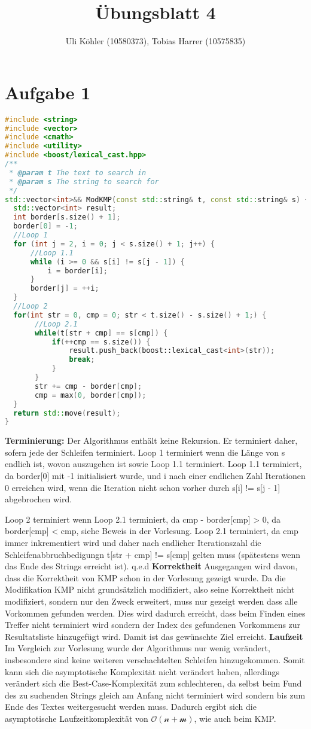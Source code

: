 \documentclass[a4paper,10pt,oneside,leqno]{scrartcl}
\title{Übungsblatt 4}
\author{Uli Köhler (10580373), Tobias Harrer (10575835)}
\begin{document}
\maketitle

\section*{Aufgabe 1}
\begin{lstlisting}[language=C++]
#include <string>
#include <vector>
#include <cmath>
#include <utility>
#include <boost/lexical_cast.hpp>
/**
 * @param t The text to search in
 * @param s The string to search for
 */
std::vector<int>&& ModKMP(const std::string& t, const std::string& s) {
  std::vector<int> result;
  int border[s.size() + 1];
  border[0] = -1;
  //Loop 1
  for (int j = 2, i = 0; j < s.size() + 1; j++) {
      //Loop 1.1
      while (i >= 0 && s[i] != s[j - 1]) {
          i = border[i];
      }
      border[j] = ++i;
  }
  //Loop 2
  for(int str = 0, cmp = 0; str < t.size() - s.size() + 1;) {
       //Loop 2.1
       while(t[str + cmp] == s[cmp]) {
           if(++cmp == s.size()) {
               result.push_back(boost::lexical_cast<int>(str));
               break;
           }
       }
       str += cmp - border[cmp];
       cmp = max(0, border[cmp]);
  }
  return std::move(result);
}
\end{lstlisting}
\textbf{Terminierung:}
Der Algorithmus enthält keine Rekursion. Er terminiert daher, sofern jede der Schleifen terminiert.
Loop 1 terminiert wenn die Länge von s endlich ist, wovon auszugehen ist sowie Loop 1.1 terminiert.
Loop 1.1 terminiert, da  border[0] mit -1 initialisiert wurde, und i nach einer endlichen Zahl Iterationen
0 erreichen wird, wenn die Iteration nicht schon vorher durch s[i] != s[j - 1] abgebrochen wird.

Loop 2 terminiert wenn Loop 2.1 terminiert, da cmp - border[cmp] > 0, da border[cmp] < cmp, siehe Beweis in der Vorlesung.
Loop 2.1 terminiert, da cmp immer inkrementiert wird und daher nach endlicher Iterationszahl die Schleifenabbruchbedigungn
t[str + cmp] != s[cmp] gelten muss (spätestens wenn das Ende des Strings erreicht ist).
q.e.d
\textbf{Korrektheit}
Ausgegangen wird davon, dass die Korrektheit von KMP schon in der Vorlesung gezeigt wurde.
Da die Modifikation KMP nicht grundsätzlich modifiziert, also seine Korrektheit nicht modifiziert,
sondern nur den Zweck erweitert, muss nur gezeigt werden dass alle Vorkommen gefunden werden.
Dies wird dadurch erreicht, dass beim Finden eines Treffer nicht terminiert wird sondern der Index
des gefundenen Vorkommens zur Resultatsliste hinzugefügt wird. Damit ist das gewünschte Ziel erreicht.
\textbf{Laufzeit}
Im Vergleich zur Vorlesung wurde der Algorithmus nur wenig verändert, insbesondere sind
keine weiteren verschachtelten Schleifen hinzugekommen.
Somit kann sich die asymptotische Komplexität nicht verändert haben, allerdings verändert sich die
Best-Case-Komplexität zum schlechteren, da selbst beim Fund des zu suchenden Strings gleich am Anfang
nicht terminiert wird sondern bis zum Ende des Textes weitergesucht werden muss.
Dadurch ergibt sich die asymptotische Laufzeitkomplexität von $\mathcal{O(n+m)}$, wie auch beim KMP.
\end{document}
